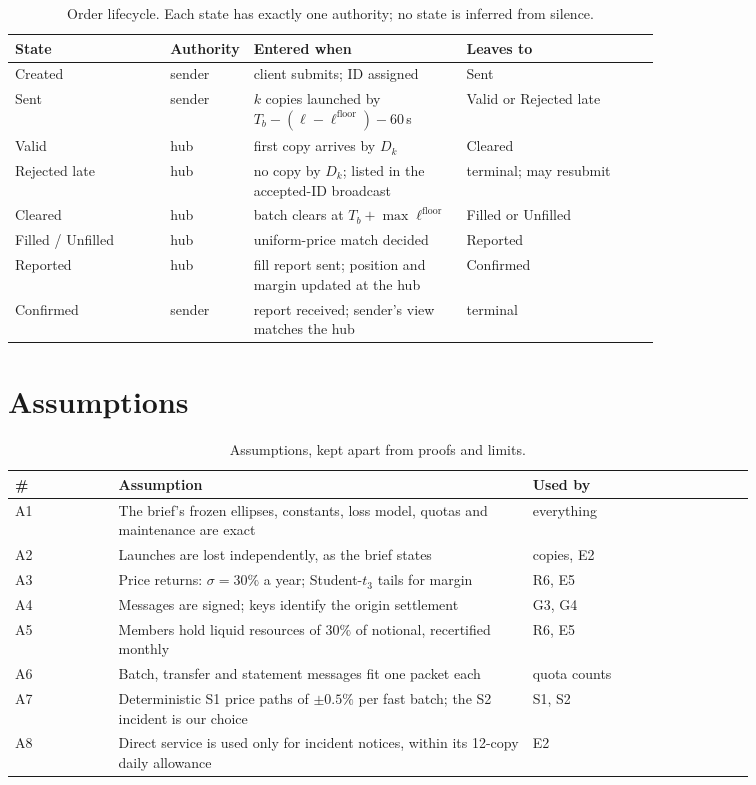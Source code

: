 \documentclass[11pt]{article}
\theoremstyle{definition}
\theoremstyle{remark}
\newcommand{\lfl}{\ell^{\mathrm{floor}}}
\begin{document}
\begin{table}[H]
\centering
\caption{Order lifecycle. Each state has exactly one authority; no state is inferred from silence.}\label{tab:life}
\small
\begin{tabular}{@{}lp{0.12\linewidth}p{0.33\linewidth}p{0.3\linewidth}@{}}
\toprule
State & Authority & Entered when & Leaves to \\
\midrule
Created & sender & client submits; ID assigned & Sent \\
Sent & sender & $k$ copies launched by $T_b-(\ell-\lfl)-60\,$s & Valid or Rejected late \\
Valid & hub & first copy arrives by $D_k$ & Cleared \\
Rejected late & hub & no copy by $D_k$; listed in the accepted-ID broadcast & terminal; may resubmit \\
Cleared & hub & batch clears at $T_b+\max\lfl$ & Filled or Unfilled \\
Filled / Unfilled & hub & uniform-price match decided & Reported \\
Reported & hub & fill report sent; position and margin updated at the hub & Confirmed \\
Confirmed & sender & report received; sender's view matches the hub & terminal \\
\bottomrule
\end{tabular}
\end{table}
\vspace{-6pt}
\section{Assumptions}\label{sec:assume}
\begin{table}[H]
\centering
\caption{Assumptions, kept apart from proofs and limits.}\label{tab:assume}
\small
\begin{tabular}{@{}lp{0.56\linewidth}p{0.3\linewidth}@{}}
\toprule
\# & Assumption & Used by \\
\midrule
A1 & The brief's frozen ellipses, constants, loss model, quotas and maintenance are exact & everything \\
A2 & Launches are lost independently, as the brief states & copies, E2 \\
A3 & Price returns: $\sigma=30\%$ a year; Student-$t_3$ tails for margin & R6, E5 \\
A4 & Messages are signed; keys identify the origin settlement & G3, G4 \\
A5 & Members hold liquid resources of $30\%$ of notional, recertified monthly & R6, E5 \\
A6 & Batch, transfer and statement messages fit one packet each & quota counts \\
A7 & Deterministic S1 price paths of $\pm0.5\%$ per fast batch; the S2 incident is our choice & S1, S2 \\
A8 & Direct service is used only for incident notices, within its 12-copy daily allowance & E2 \\
\bottomrule
\end{tabular}
\end{table}
\vspace{-6pt}
\end{document}

